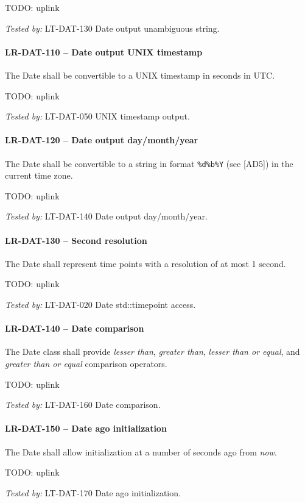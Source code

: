 TODO: uplink

\textit{Tested by: } LT-DAT-130 Date output unambiguous string.

\paragraph{LR-DAT-110 -- Date output UNIX timestamp}
The Date shall be convertible to a UNIX timestamp in seconds in \gls{UTC}.

TODO: uplink

\textit{Tested by: } LT-DAT-050 UNIX timestamp output.

\paragraph{LR-DAT-120 -- Date output day/month/year}
The Date shall be convertible to a string in format
\lstinline{%d%b%Y} (see [AD5]) in the current time zone.

TODO: uplink

\textit{Tested by: } LT-DAT-140 Date output day/month/year.

\paragraph{LR-DAT-130 -- Second resolution}
The Date shall represent time points with a resolution of at most 1 second.

TODO: uplink

\textit{Tested by: } LT-DAT-020 Date std::time\textunderscore point access.

\paragraph{LR-DAT-140 -- Date comparison}
The Date class shall provide \emph{lesser than}, \emph{greater than},
\emph{lesser than or equal}, and \emph{greater than or equal} comparison
operators.

TODO: uplink

\textit{Tested by: } LT-DAT-160 Date comparison.

\paragraph{LR-DAT-150 -- Date ago initialization}
The Date shall allow initialization at a number of seconds ago from
\emph{now}.

TODO: uplink

\textit{Tested by: } LT-DAT-170 Date ago initialization.

